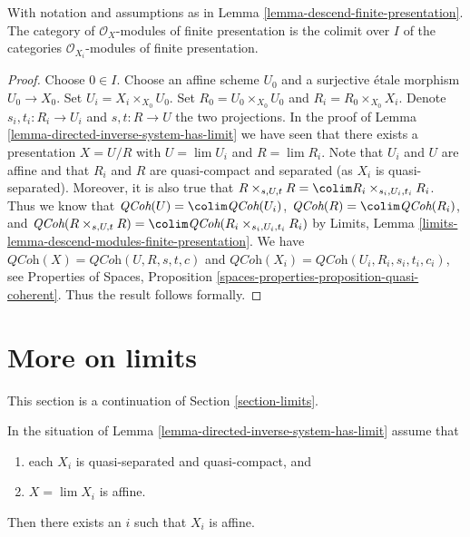 \begin{lemma}
\label{lemma-descend-modules-finite-presentation}
With notation and assumptions as in
Lemma \ref{lemma-descend-finite-presentation}.
The category of $\mathcal{O}_X$-modules of finite presentation is the
colimit over $I$ of the categories $\mathcal{O}_{X_i}$-modules of finite
presentation.
\end{lemma}

\begin{proof}
Choose $0 \in I$. Choose an affine scheme $U_0$ and a surjective
\'etale morphism $U_0 \to X_0$. Set $U_i = X_i \times_{X_0} U_0$.
Set $R_0 = U_0 \times_{X_0} U_0$ and $R_i = R_0 \times_{X_0} X_i$.
Denote $s_i, t_i : R_i \to U_i$ and $s, t : R \to U$ the two
projections. In the proof of
Lemma \ref{lemma-directed-inverse-system-has-limit} we have
seen that there exists a presentation $X = U/R$ with
$U = \lim U_i$ and $R = \lim R_i$. Note that $U_i$ and $U$ are affine and
that $R_i$ and $R$ are quasi-compact and separated (as $X_i$ is
quasi-separated). Moreover, it is also true that
$R \times_{s, U, t} R = \colim R_i \times_{s_i, U_i, t_i} R_i$.
Thus we know that $\textit{QCoh}(U) = \colim \textit{QCoh}(U_i)$,
$\textit{QCoh}(R) = \colim \textit{QCoh}(R_i)$, and
$\textit{QCoh}(R \times_{s, U, t} R) = \colim
\textit{QCoh}(R_i \times_{s_i, U_i, t_i} R_i)$ by
Limits, Lemma \ref{limits-lemma-descend-modules-finite-presentation}.
We have $\textit{QCoh}(X) = \textit{QCoh}(U, R, s, t, c)$ and
$\textit{QCoh}(X_i) = \textit{QCoh}(U_i, R_i, s_i, t_i, c_i)$, see
Properties of Spaces, Proposition
\ref{spaces-properties-proposition-quasi-coherent}.
Thus the result follows formally.
\end{proof}









\section{More on limits}
\label{section-more-limits}

\noindent
This section is a continuation of Section \ref{section-limits}.

\begin{lemma}
\label{lemma-limit-is-affine}
In the situation of Lemma \ref{lemma-directed-inverse-system-has-limit}
assume that
\begin{enumerate}
\item each $X_i$ is quasi-separated and quasi-compact, and
\item $X = \lim X_i$ is affine.
\end{enumerate}
Then there exists an $i$ such that $X_i$ is affine.
\end{lemma}

